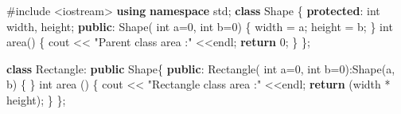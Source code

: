 \documentclass[
]{article}
\newenvironment{Shaded}{}{}
\newcommand{\ControlFlowTok}[1]{\textcolor[rgb]{0.00,0.44,0.13}{\textbf{#1}}}
\newcommand{\DataTypeTok}[1]{\textcolor[rgb]{0.56,0.13,0.00}{#1}}
\newcommand{\DecValTok}[1]{\textcolor[rgb]{0.25,0.63,0.44}{#1}}
\newcommand{\ImportTok}[1]{#1}
\newcommand{\KeywordTok}[1]{\textcolor[rgb]{0.00,0.44,0.13}{\textbf{#1}}}
\newcommand{\NormalTok}[1]{#1}
\newcommand{\OperatorTok}[1]{\textcolor[rgb]{0.40,0.40,0.40}{#1}}
\newcommand{\PreprocessorTok}[1]{\textcolor[rgb]{0.74,0.48,0.00}{#1}}
\newcommand{\StringTok}[1]{\textcolor[rgb]{0.25,0.44,0.63}{#1}}
\begin{document}
\begin{Shaded}
\begin{Highlighting}[]
\PreprocessorTok{\#include }\ImportTok{\textless{}iostream\textgreater{}}
\KeywordTok{using} \KeywordTok{namespace}\NormalTok{ std}\OperatorTok{;}
\KeywordTok{class}\NormalTok{ Shape }\OperatorTok{\{}
   \KeywordTok{protected}\OperatorTok{:}
      \DataTypeTok{int}\NormalTok{ width}\OperatorTok{,}\NormalTok{ height}\OperatorTok{;}
   \KeywordTok{public}\OperatorTok{:}
\NormalTok{      Shape}\OperatorTok{(} \DataTypeTok{int}\NormalTok{ a}\OperatorTok{=}\DecValTok{0}\OperatorTok{,} \DataTypeTok{int}\NormalTok{ b}\OperatorTok{=}\DecValTok{0}\OperatorTok{)}
      \OperatorTok{\{}
\NormalTok{         width }\OperatorTok{=}\NormalTok{ a}\OperatorTok{;}
\NormalTok{         height }\OperatorTok{=}\NormalTok{ b}\OperatorTok{;}
      \OperatorTok{\}}
      \DataTypeTok{int}\NormalTok{ area}\OperatorTok{()}
      \OperatorTok{\{}
\NormalTok{         cout }\OperatorTok{\textless{}\textless{}} \StringTok{"Parent class area :"} \OperatorTok{\textless{}\textless{}}\NormalTok{endl}\OperatorTok{;}
         \ControlFlowTok{return} \DecValTok{0}\OperatorTok{;}
      \OperatorTok{\}}
\OperatorTok{\};}
      
\KeywordTok{class}\NormalTok{ Rectangle}\OperatorTok{:} \KeywordTok{public}\NormalTok{ Shape}\OperatorTok{\{}
   \KeywordTok{public}\OperatorTok{:}
\NormalTok{      Rectangle}\OperatorTok{(} \DataTypeTok{int}\NormalTok{ a}\OperatorTok{=}\DecValTok{0}\OperatorTok{,} \DataTypeTok{int}\NormalTok{ b}\OperatorTok{=}\DecValTok{0}\OperatorTok{):}\NormalTok{Shape}\OperatorTok{(}\NormalTok{a}\OperatorTok{,}\NormalTok{ b}\OperatorTok{)} \OperatorTok{\{} \OperatorTok{\}}
      \DataTypeTok{int}\NormalTok{ area }\OperatorTok{()}
      \OperatorTok{\{} 
\NormalTok{         cout }\OperatorTok{\textless{}\textless{}} \StringTok{"Rectangle class area :"} \OperatorTok{\textless{}\textless{}}\NormalTok{endl}\OperatorTok{;}
         \ControlFlowTok{return} \OperatorTok{(}\NormalTok{width }\OperatorTok{*}\NormalTok{ height}\OperatorTok{);} 
      \OperatorTok{\}}
\OperatorTok{\};}


\end{Highlighting}
\end{Shaded}
\end{document}
